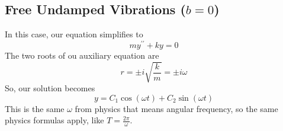 \subsection{Free Undamped Vibrations ($b = 0$)}
\noindent
In this case, our equation simplifies to
\begin{equation*}
	my^{\prime\prime} + ky = 0
\end{equation*}
The two roots of ou auxiliary equation are
\begin{equation*}
	r = \pm i \sqrt{\frac{k}{m}} = \pm i\omega
\end{equation*}
So, our solution becomes
\begin{equation*}
	y = C_1\cos{(\omega t)} + C_2\sin{(\omega t)}
\end{equation*}
This is the same $\omega$ from physics that means angular frequency, so the same physics formulas apply, like $T = \frac{2\pi}{\omega}$.\\

